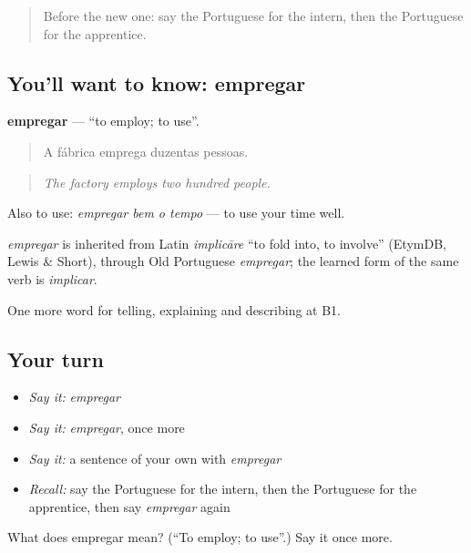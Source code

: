\begin{quote}
Before the new one: say the Portuguese for the intern, then the Portuguese for the apprentice.
\end{quote}

\subsection*{You'll want to know: empregar}
\textbf{empregar} — \textquotedblleft{}to employ; to use\textquotedblright{}.

\begin{quote}
A fábrica emprega duzentas pessoas.
\end{quote}

\begin{quote}
\emph{The factory employs two hundred people.}
\end{quote}

Also to use: \emph{empregar bem o tempo} — to use your time well.

\begin{cousinweb}
\emph{empregar} is inherited from Latin \emph{implicāre} \textquotedblleft{}to fold into, to involve\textquotedblright{} (EtymDB, Lewis \& Short), through Old Portuguese \emph{empregar}; the learned form of the same verb is \emph{implicar}.
\end{cousinweb}

\begin{grammarlens}[title={What you've built}]
One more word for telling, explaining and describing at B1.
\end{grammarlens}

\subsection*{Your turn}
\begin{itemize}
\raggedright
  \item \emph{Say it:} \emph{empregar}
  \item \emph{Say it:} \emph{empregar}, once more
  \item \emph{Say it:} a sentence of your own with \emph{empregar}
  \item \emph{Recall:} say the Portuguese for the intern, then the Portuguese for the apprentice, then say \emph{empregar} again
\end{itemize}

\begin{tcolorbox}[breakable,colback=teal!4,colframe=teal!35!black,title={Before you move on}]
What does empregar mean? (\textquotedblleft{}To employ; to use\textquotedblright{}.) Say it once more.
\end{tcolorbox}
